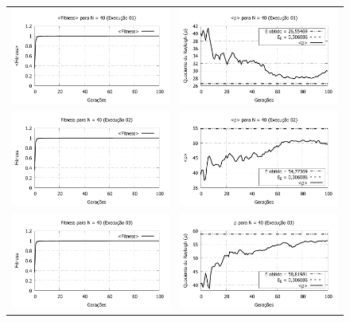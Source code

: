 \begin{figure}[phtb]
\centering
  \begin{tabular}{@{}cc@{}}
    \includegraphics[width=.40\textwidth]{figs/resultados/N40_01_fitness.pdf} &
    \includegraphics[width=.40\textwidth]{figs/resultados/N40_01_rho.pdf}   \\
		\includegraphics[width=.40\textwidth]{figs/resultados/N40_02_fitness.pdf} &
    \includegraphics[width=.40\textwidth]{figs/resultados/N40_02_rho.pdf}   \\
		\includegraphics[width=.40\textwidth]{figs/resultados/N40_03_fitness.pdf} &
    \includegraphics[width=.40\textwidth]{figs/resultados/N40_03_rho.pdf}   \\

\end{tabular}
\end{figure}
